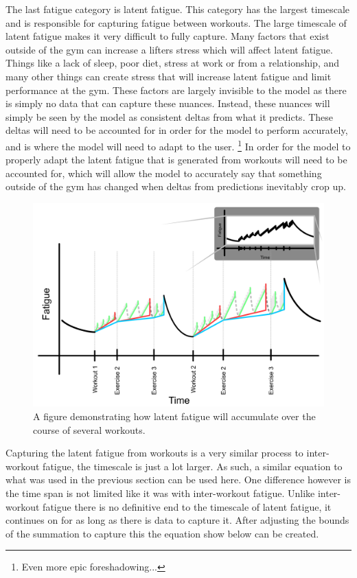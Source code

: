 The last fatigue category is latent fatigue. This category has the largest timescale and is responsible for capturing fatigue between workouts. The large timescale of latent fatigue makes it very difficult to fully capture. Many factors that exist outside of the gym can increase a lifters stress which will affect latent fatigue. Things like a lack of sleep, poor diet, stress at work or from a relationship, and many other things can create stress that will increase latent fatigue and limit performance at the gym. These factors are largely invisible to the model as there is simply no data that can capture these nuances. Instead, these nuances will simply be seen by the model as consistent deltas from what it predicts. These deltas will need to be accounted for in order for the model to perform accurately, and is where the model will need to adapt to the user. \footnote{Even more epic foreshadowing...} In order for the model to properly adapt the latent fatigue that is generated from workouts will need to be accounted for, which will allow the model to accurately say that something outside of the gym has changed when deltas from predictions inevitably crop up.

\begin{figure}[htb]
    \centering
    \includegraphics[scale=0.55]{images/p2/ch1/LatentFatigue.png}
    \caption{A figure demonstrating how latent fatigue will accumulate over the course of several workouts.}
    \label{fig:P2C1_LatentFatigue}
\end{figure}

Capturing the latent fatigue from workouts is a very similar process to inter-workout fatigue, the timescale is just a lot larger. As such, a similar equation to what was used in the previous section can be used here. One difference however is the time span is not limited like it was with inter-workout fatigue. Unlike inter-workout fatigue there is no definitive end to the timescale of latent fatigue, it continues on for as long as there is data to capture it. After adjusting the bounds of the summation to capture this the equation show below can be created.

